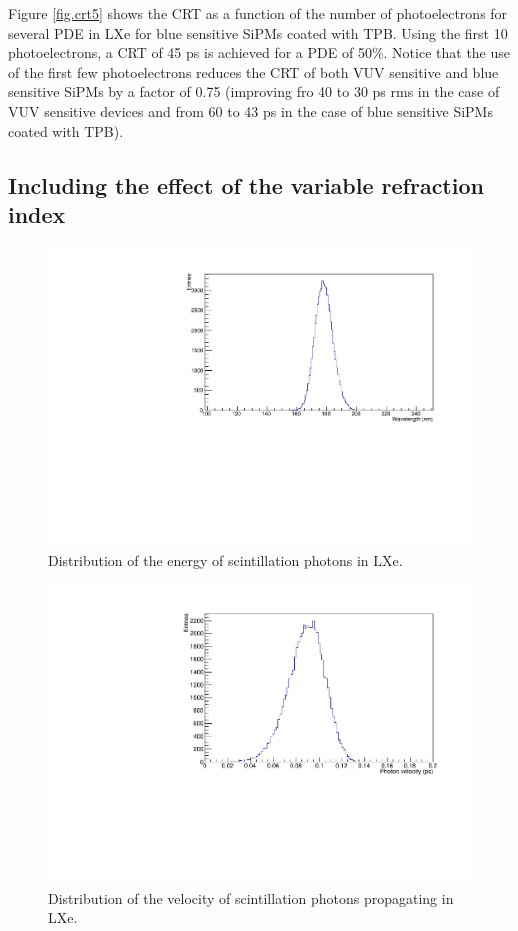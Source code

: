 \documentclass[review]{elsarticle}
\begin{document}
Figure \ref{fig.crt5} shows the CRT as a function of the number of photoelectrons for several PDE in LXe for blue sensitive SiPMs coated with TPB. Using the first 10 photoelectrons, a CRT of 45 ps is achieved for a  PDE of 50\%. Notice that the use of the first few photoelectrons reduces the CRT of both VUV sensitive and blue sensitive SiPMs 
by a factor of 0.75 (improving fro 40 to 30 ps rms in the case of VUV sensitive devices and from 60 to 43 ps in the case of blue sensitive SiPMs coated with TPB).    

\subsection*{Including the effect of the variable refraction index}

\begin{figure}[!bhtp]
	\centering
	\includegraphics[scale=0.5]{../img/ScintillationSpectrumLXe.pdf}
	\caption{\label{fig.spectrumLXe} Distribution of the energy of scintillation photons in LXe.}
\end{figure}

\begin{figure}[!bhtp]
	\centering
	\includegraphics[scale=0.5]{../img/VelocityDistrLXe.pdf}
	\caption{\label{fig.vLXe} Distribution of the velocity of scintillation photons propagating in LXe.}
\end{figure}
\end{document}

